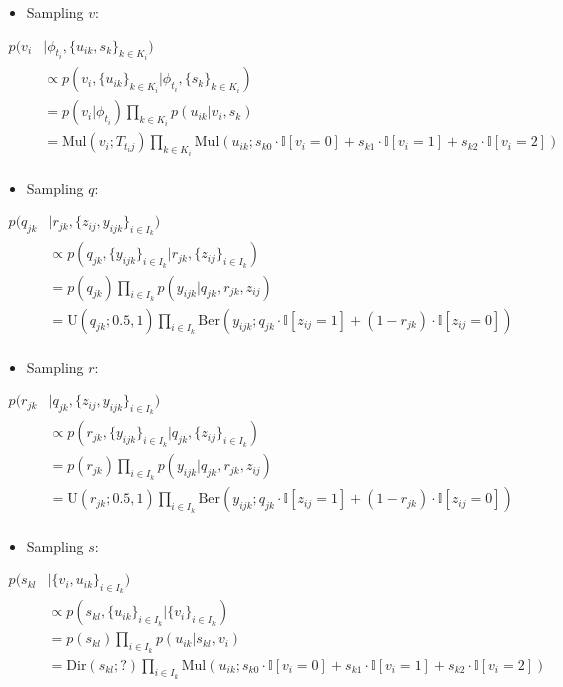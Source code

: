 \documentclass[11pt]{article}
\theoremstyle{plain}
\theoremstyle{definition}
\begin{document}
\begin{itemize}
\item Sampling $v$:
\end{itemize}
\begin{align*}
p(v_i &| \phi_{t_i}, \{u_{ik}, s_{k}\}_{k \in K_i}) \\
&\propto p(v_i, \{u_{ik}\}_{k \in K_i} | \phi_{t_i}, \{s_{k}\}_{k \in K_i}) \\
&= p(v_i | \phi_{t_i}) \prod_{k \in K_i} p(u_{ik} | v_i, s_{k}) \\
&= \textrm{Mul}(v_i ; T_{t_i j} ) \prod_{k \in K_i} \textrm{Mul}(u_{ik} ; s_{k0} \cdot \mathbb{I}[v_i = 0] + s_{k1} \cdot \mathbb{I}[v_i = 1] + s_{k2} \cdot \mathbb{I}[v_i = 2])\\
\end{align*}

\begin{itemize}
\item Sampling $q$:
\end{itemize}
\begin{align*}
p(q_{jk} &| r_{jk}, \{z_{ij}, y_{ijk}\}_{i \in I_k}) \\
&\propto p(q_{jk}, \{y_{ijk}\}_{i \in I_k} | r_{jk}, \{z_{ij}\}_{i \in I_k}) \\
&= p(q_{jk}) \prod_{i \in I_k} p(y_{ijk} | q_{jk}, r_{jk}, z_{ij}) \\
&= \textrm{U}(q_{jk} ; 0.5, 1) \prod_{i \in I_k} \textrm{Ber}(y_{ijk} ; q_{jk} \cdot \mathbb{I}[z_{ij}=1] + (1-r_{jk}) \cdot \mathbb{I}[z_{ij}=0])\\
\end{align*}


\begin{itemize}
\item Sampling $r$:
\end{itemize}
\begin{align*}
p(r_{jk} &| q_{jk}, \{z_{ij}, y_{ijk}\}_{i \in I_k}) \\
&\propto p(r_{jk}, \{y_{ijk}\}_{i \in I_k} | q_{jk}, \{z_{ij}\}_{i \in I_k}) \\
&= p(r_{jk}) \prod_{i \in I_k} p(y_{ijk} | q_{jk}, r_{jk}, z_{ij}) \\
&= \textrm{U}(r_{jk} ; 0.5, 1) \prod_{i \in I_k} \textrm{Ber}(y_{ijk} ; q_{jk} \cdot \mathbb{I}[z_{ij}=1] + (1-r_{jk}) \cdot \mathbb{I}[z_{ij}=0])\\
\end{align*}



\begin{itemize}
\item Sampling $s$:
\end{itemize}
\begin{align*}
p(s_{kl} &| \{v_i, u_{ik}\}_{i \in I_k}) \\
&\propto p(s_{kl}, \{u_{ik}\}_{i \in I_k} | \{v_i\}_{i \in I_k}) \\
&= p(s_{kl}) \prod_{i \in I_k} p(u_{ik} | s_{kl}, v_i) \\
&= \textrm{Dir}(s_{kl} ; ? ) \prod_{i \in I_k} \textrm{Mul}(u_{ik} ; s_{k0} \cdot \mathbb{I}[v_i = 0] + s_{k1} \cdot \mathbb{I}[v_i = 1] + s_{k2} \cdot \mathbb{I}[v_i = 2])\\
\end{align*}
\end{document}
